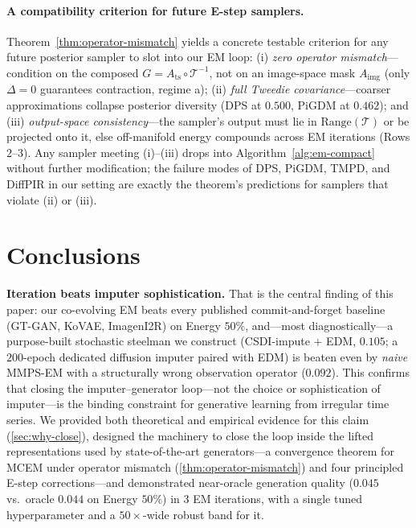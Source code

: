 \documentclass{article}
\theoremstyle{plain}
\theoremstyle{definition}
\theoremstyle{remark}
\newcommand{\tsimg}{\mathcal{T}}
\newcommand{\imgts}{\mathcal{T}^{-1}}
\newcommand{\Ats}{A_{\mathrm{ts}}}
\newcommand{\Aimg}{A_{\mathrm{img}}}
\begin{document}
\paragraph{A compatibility criterion for future E-step samplers.}
Theorem~\ref{thm:operator-mismatch} yields a concrete testable criterion for any future posterior sampler to slot into our EM loop: (i) \emph{zero operator mismatch}---condition on the composed $G = \Ats \circ \imgts$, not on an image-space mask $\Aimg$ (only $\Delta = 0$ guarantees contraction, regime a); (ii) \emph{full Tweedie covariance}---coarser approximations collapse posterior diversity (DPS at $0.500$, PiGDM at $0.462$); and (iii) \emph{output-space consistency}---the sampler's output must lie in $\mathrm{Range}(\tsimg)$ or be projected onto it, else off-manifold energy compounds across EM iterations (Rows $2$--$3$). Any sampler meeting (i)--(iii) drops into Algorithm~\ref{alg:em-compact} without further modification; the failure modes of DPS, PiGDM, TMPD, and DiffPIR in our setting are exactly the theorem's predictions for samplers that violate (ii) or (iii).

\vspace{-2mm}
\section{Conclusions}
\label{sec:conclusions}
\vspace{-1mm}

\textbf{Iteration beats imputer sophistication.} That is the central finding of this paper: our co-evolving EM beats every published commit-and-forget baseline (GT-GAN, KoVAE, ImagenI2R) on Energy $50\%$, and---most diagnostically---a purpose-built stochastic steelman we construct (CSDI-impute $+$ EDM, $0.105$; a $200$-epoch dedicated diffusion imputer paired with EDM) is beaten even by \emph{naive} MMPS-EM with a structurally wrong observation operator ($0.092$). This confirms that closing the imputer--generator loop---not the choice or sophistication of imputer---is the binding constraint for generative learning from irregular time series. We provided both theoretical and empirical evidence for this claim (\cref{sec:why-close}), designed the machinery to close the loop inside the lifted representations used by state-of-the-art generators---a convergence theorem for MCEM under operator mismatch (\cref{thm:operator-mismatch}) and four principled E-step corrections---and demonstrated near-oracle generation quality ($0.045$ vs.\ oracle $0.044$ on Energy $50\%$) in $3$ EM iterations, with a single tuned hyperparameter and a $50\times$-wide robust band for it.
\end{document}
